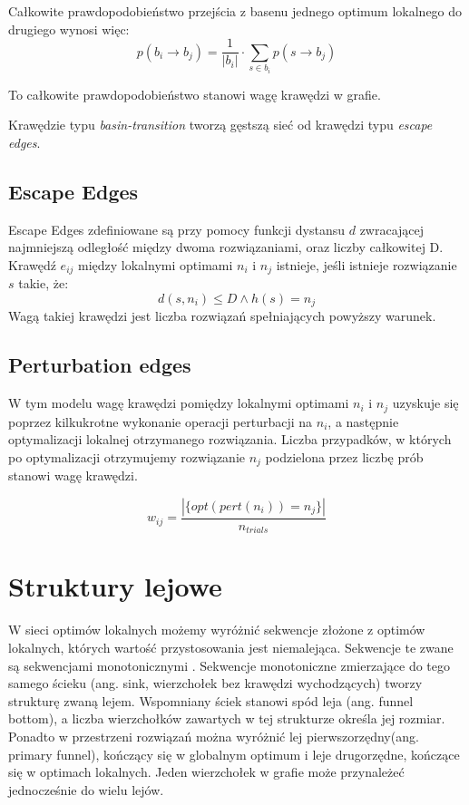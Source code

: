 Całkowite prawdopodobieństwo przejścia z basenu jednego optimum lokalnego do drugiego wynosi więc:
$$p(b_i \rightarrow b_j) = \frac{1}{|b_i|} \cdot \sum_{s\in{b_i}} p(s \rightarrow b_j)$$

To całkowite prawdopodobieństwo stanowi wagę krawędzi w grafie.

Krawędzie typu \textit{basin-transition} tworzą gęstszą sieć od krawędzi typu \textit{escape edges}.

\subsection{Escape Edges}
Escape Edges zdefiniowane są przy pomocy funkcji dystansu $d$ zwracającej najmniejszą odległość między dwoma rozwiązaniami,
oraz liczby całkowitej D.
Krawędź $e_{ij}$ między lokalnymi optimami $n_i$ i $n_j$ istnieje, jeśli istnieje rozwiązanie $s$ takie, że:
\begin{equation}
      \label{eq:escape_edge_cond}
      d(s, n_i) \leq D \land h(s)=n_j
\end{equation}
Wagą takiej krawędzi jest liczba rozwiązań spełniających powyższy warunek.

\subsection{Perturbation edges}
W tym modelu wagę krawędzi pomiędzy lokalnymi optimami $n_i$ i $n_j$ uzyskuje się poprzez kilkukrotne wykonanie
operacji perturbacji na $n_i$, a następnie optymalizacji lokalnej otrzymanego rozwiązania.
Liczba przypadków, w których po optymalizacji otrzymujemy rozwiązanie $n_j$ podzielona przez liczbę prób stanowi wagę krawędzi.

$$
      w_{ij} = \frac{ |\{opt(pert(n_i)) = n_j\}| }{n_{trials}}
$$

\section{Struktury lejowe}
W sieci optimów lokalnych możemy wyróżnić sekwencje złożone z optimów lokalnych, których wartość przystosowania jest niemalejąca.
Sekwencje te zwane są sekwencjami monotonicznymi \cite{DBLP:journals/heuristics/OchoaV18}.
Sekwencje monotoniczne zmierzające do tego samego ścieku (ang. sink, wierzchołek bez krawędzi wychodzących)
tworzy strukturę zwaną lejem. Wspomniany ściek stanowi spód leja (ang. funnel bottom), a liczba wierzchołków zawartych w tej strukturze określa jej rozmiar.
Ponadto w przestrzeni rozwiązań można wyróżnić lej pierwszorzędny(ang. primary funnel), kończący się w globalnym optimum i leje drugorzędne,
kończące się w optimach lokalnych. Jeden wierzchołek w grafie może przynależeć jednocześnie do wielu lejów.

